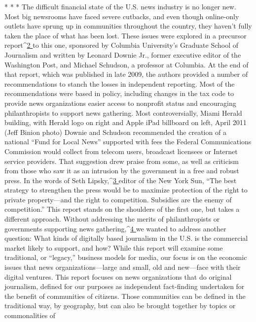 * * *
The difficult financial state of the U.S. news industry is no longer new. Most
big newsrooms have faced severe cutbacks, and even though online-only outlets
have sprung up in communities throughout the country, they haven’t fully taken
the place of what has been lost.
These issues were explored in a precursor report^{\href{#endnotes-intro}{2 }}to this one, sponsored by
Columbia University’s Graduate School of Journalism and written by Leonard
Downie Jr., former executive editor of the Washington Post, and Michael Schudson,
a professor at Columbia. At the end of that report, which was published in
late 2009, the authors provided a number of recommendations to stanch the
losses in independent reporting.
Most of the recommendations were based in policy, including changes in the
tax code to provide news organizations easier access to nonprofit status and
encouraging philanthropists to support news gathering. Most controversially,
Miami Herald building, with Herald logo on right and Apple iPad billboard on left, April 2011 (Jeff Binion photo)
Downie and Schudson recommended the creation of a national ``Fund for Local
News'' supported with fees the Federal Communications Commission would
collect from telecom users, broadcast licensees or Internet service providers.
That suggestion drew praise from some, as well as criticism from those who
saw it as an intrusion by the government in a free and robust press. In the words
of Seth Lipsky,^{\href{#endnotes-intro}{3 }}editor of the New York Sun, ``The best strategy to strengthen the
press would be to maximize protection of the right to private property—and the
right to competition. Subsidies are the enemy of competition.''
This report stands on the shoulders of the first one, but takes a different approach.
Without addressing the merits of philanthropists or governments supporting
news gathering,^{\href{#endnotes-intro}{4 }}we wanted to address another question: What kinds of
digitally based journalism in the U.S. is the commercial market likely to support,
and how?
While this report will examine some traditional, or ``legacy,'' business models
for media, our focus is on the economic issues that news organizations—large
and small, old and new—face with their digital ventures.
This report focuses on news organizations that do original journalism, defined
for our purposes as independent fact-finding undertaken for the benefit of communities
of citizens. Those communities can be defined in the traditional way,
by geography, but can also be brought together by topics or commonalities of
